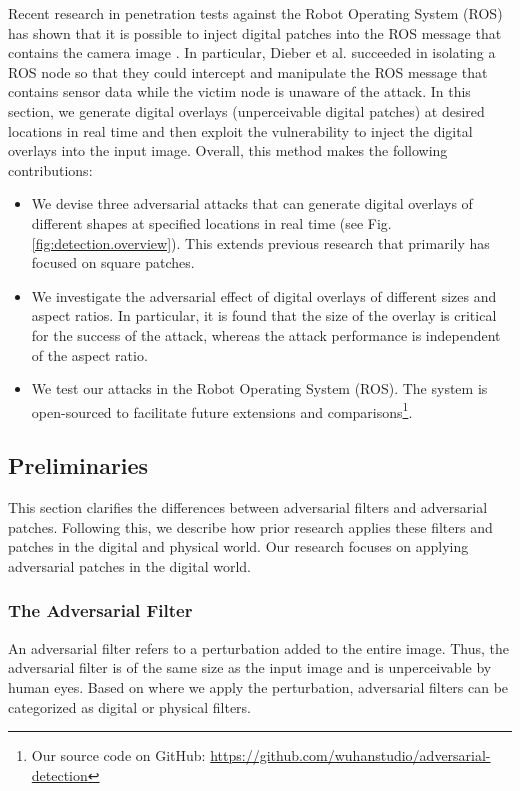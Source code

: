 Recent research in penetration tests against the Robot Operating System (ROS) has shown that it is possible to inject digital patches into the ROS message that contains the camera image \citep{dieber2020penetration}. In particular, Dieber et al. succeeded in isolating a ROS node so that they could intercept and manipulate the ROS message that contains sensor data while the victim node is unaware of the attack. In this section, we generate digital overlays (unperceivable digital patches) at desired locations in real time and then exploit the vulnerability to inject the digital overlays into the input image. Overall, this method makes the following contributions:
\begin{itemize}
    \item We devise three adversarial attacks that can generate digital overlays of different shapes at specified locations in real time (see Fig. \ref{fig:detection.overview}). This extends previous research that primarily has focused on square patches.
    \item We investigate the adversarial effect of digital overlays of different sizes and aspect ratios. In particular, it is found that the size of the overlay is critical for the success of the attack, whereas the attack performance is independent of the aspect ratio. 
    \item We test our attacks in the Robot Operating System (ROS). The system is open-sourced to facilitate future extensions and comparisons\footnote{Our source code on GitHub: \url{https://github.com/wuhanstudio/adversarial-detection}}.
\end{itemize}

\subsection{Preliminaries}
\label{section_preliminaries}

This section clarifies the differences between adversarial filters and adversarial patches. Following this, we describe how prior research applies these filters and patches in the digital and physical world. Our research focuses on applying adversarial patches in the digital world.

\subsubsection{The Adversarial Filter}

An adversarial filter refers to a perturbation added to the entire image. Thus, the adversarial filter is of the same size as the input image and is unperceivable by human eyes. Based on where we apply the perturbation, adversarial filters can be categorized as digital or physical filters.

